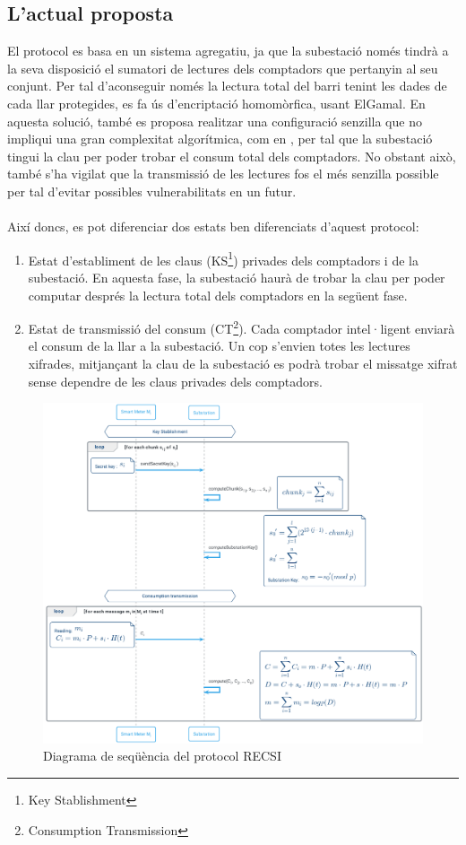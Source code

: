 \documentclass{article}
\begin{document}
\subsection{L'actual proposta}
El protocol \cite{recsi} es basa en un sistema agregatiu, ja que la subestació només tindrà a la seva disposició el sumatori de lectures dels comptadors que pertanyin al seu conjunt. Per tal d'aconseguir només la lectura total del barri tenint les dades de cada llar protegides, es fa ús d'encriptació homomòrfica, usant ElGamal.
En aquesta solució, també es proposa realitzar una configuració senzilla que no impliqui una gran complexitat algorítmica, com en \cite{busom}, per tal que la subestació tingui la clau per poder trobar el consum total dels comptadors. No obstant això, també s'ha vigilat que la transmissió de les lectures fos el més senzilla possible per tal d'evitar possibles vulnerabilitats en un futur. \\\\
Així doncs, es pot diferenciar dos estats ben diferenciats d'aquest protocol:
\begin{enumerate}
\item Estat d'establiment de les claus (KS\footnote{Key Stablishment}) privades dels comptadors i de la subestació. En aquesta fase, la subestació haurà de trobar la clau per poder computar després la lectura total dels comptadors en la següent fase.
\item Estat de transmissió del consum (CT\footnote{Consumption Transmission}). Cada comptador intel·ligent enviarà el consum de la llar a la subestació. Un cop s'envien totes les lectures xifrades, mitjançant la clau de la subestació es podrà trobar el missatge xifrat sense dependre de les claus privades dels comptadors. 
\end{enumerate}
\begin{figure}[H]
	\centering
	\includegraphics[width=16cm]{umls/recsi.png}
	\caption{Diagrama de seqüència del protocol RECSI}
\end{figure}
\end{document}
